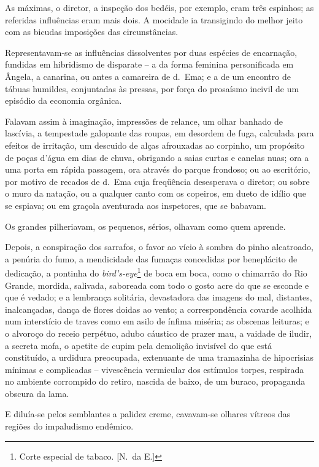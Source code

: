 As máximas, o diretor, a inspeção dos
bedéis, por exemplo, eram três espinhos; as referidas influências eram
mais dois. A mocidade ia transigindo do melhor jeito com as bicudas
imposições das circunstâncias. 

Representavam{}-se as influências
dissolventes por duas espécies de encarnação, fundidas em hibridismo de
disparate -- a da forma feminina personificada em Ângela, a canarina,
ou antes a camareira de d.~Ema; e a de um encontro de tábuas humildes,
conjuntadas às pressas, por força do prosaísmo incivil de um episódio
da economia orgânica. 

Falavam assim à imaginação, impressões de
relance, um olhar banhado de lascívia, a tempestade galopante das
roupas, em desordem de fuga, calculada para efeitos de irritação, um
descuido de alças afrouxadas ao corpinho, um propósito de poças d'água
em dias de chuva, obrigando a saias curtas e canelas nuas; ora a uma
porta em rápida passagem, ora através do parque frondoso; ou ao
escritório, por motivo de recados de d.~Ema cuja freqüência desesperava o diretor;
ou sobre o muro da natação, ou a qualquer canto com os copeiros, em
dueto de idílio que se espiava; ou em graçola aventurada aos
inspetores, que se babavam. 

Os grandes pilheriavam, os pequenos,
sérios, olhavam como quem aprende. 

Depois, a conspiração dos sarrafos,
o favor ao vício à sombra do pinho alcatroado, a penúria do fumo, a
mendicidade das fumaças concedidas por beneplácito de dedicação, a
pontinha do \textit{bird's{}-eye}\footnote{ Corte especial de tabaco. [N.~da E.]} 
de boca em boca, como o chimarrão do Rio
Grande, mordida, salivada, saboreada com todo o gosto acre do que se
esconde e que é vedado; e a lembrança solitária, devastadora das
imagens do mal, distantes, inalcançadas, dança de flores doidas ao
vento; a correspondência covarde acolhida num interstício de traves
como em asilo de ínfima miséria; as obscenas leituras; e o alvoroço do
receio perpétuo, adubo cáustico de prazer mau, a vaidade de iludir, a
secreta mofa, o apetite de cupim pela demolição invisível do que está
constituído, a urdidura preocupada, extenuante de uma tramazinha de
hipocrisias mínimas e complicadas -- vivescência vermicular dos
estímulos torpes, respirada no ambiente corrompido do retiro, nascida
de baixo, de um buraco, propaganda obscura da lama. 

E diluía{}-se pelos semblantes a palidez creme, cavavam{}-se 
olhares vítreos das regiões do impaludismo endêmico. 

